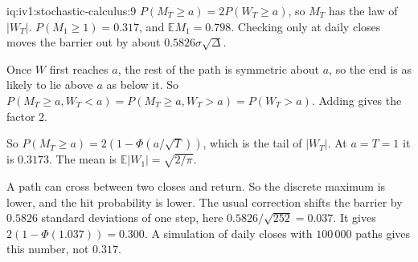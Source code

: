 \begin{solution}{iq:iv1:stochastic-calculus:9}
$P(M_T \ge a) = 2P(W_T \ge a)$, so $M_T$ has the law of $|W_T|$. $P(M_1 \ge 1) = 0.317$, and $\mathbb{E}M_1 = 0.798$. Checking only at daily closes moves the barrier out by about $0.5826\sigma\sqrt{\Delta}$.

Once $W$ first reaches $a$, the rest of the path is symmetric about $a$, so the end is as likely to lie above $a$ as below it. So $P(M_T \ge a, W_T < a) = P(M_T \ge a, W_T > a) = P(W_T > a)$. Adding gives the factor 2.

So $P(M_T \ge a) = 2(1 - \Phi(a/\sqrt{T}))$, which is the tail of $|W_T|$. At $a = T = 1$ it is $0.3173$. The mean is $\mathbb{E}|W_1| = \sqrt{2/\pi}$.

A path can cross between two closes and return. So the discrete maximum is lower, and the hit probability is lower. The usual correction shifts the barrier by $0.5826$ standard deviations of one step, here $0.5826/\sqrt{252} = 0.037$. It gives $2(1 - \Phi(1.037)) = 0.300$. A simulation of daily closes with $100\,000$ paths gives this number, not $0.317$.



\end{solution}

